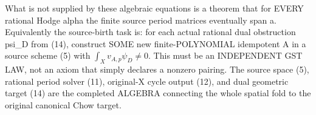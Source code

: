 \documentclass[11pt]{article}
\begin{document}
What is not supplied by these algebraic equations is
a theorem that for EVERY rational Hodge alpha the
finite source period matrices eventually span a.
Equivalently the source-birth task is:
for each actual rational dual obstruction psi_D
from (14), construct SOME new finite-POLYNOMIAL
idempotent A in a source scheme (5)
with \(\int_X v_{A,p}\psi_D\ne0\).
This must be an INDEPENDENT GST LAW, not an axiom
that simply declares a nonzero pairing.
The source space (5), rational period solver (11),
original-X cycle output (12), and dual
geometric target (14) are the completed
ALGEBRA connecting the whole spatial fold
to the original canonical Chow target.
\end{document}
